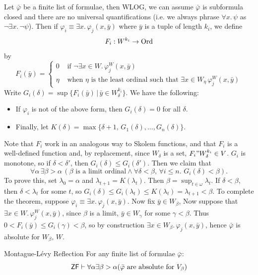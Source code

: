 \documentclass{article}
\begin{document}
\proof Let $\bar{\varphi}$ be a finite list of formulae, then WLOG, we can assume $\bar{\varphi}$ is subformula closed and there are no universal quantifications (i.e. we always phrase $\forall x.\, \psi$ as $\neg \exists x. \, \neg \psi$). \gap
Then if $\varphi_{i} \equiv \exists x.\, \varphi_{j} (x,\bar{y})$ where $\bar{y}$ is a tuple of length $k_{i}$, we define \[F_{i} : W^{k_{i}} \to \operatorname{Ord}\] by \[ F_{i}(\bar{y}) =
    \begin{cases}
        0    & \text{ if $\neg \exists x \in W. \, \varphi_{j}^{W}(x, \bar{y})$}                                        \\
        \eta & \text{ when $\eta$ is the least ordinal such that $\exists x \in W_{\eta}\, \varphi_{j}^{W}(x,\bar{y})$}
    \end{cases}\]
Write $G_{i}(\delta) = \sup \{ F_{i}(\bar{y}) \, | \, \bar{y} \in W_{\delta}^{k_{i}}\}$. We have the following: \begin{itemize}
    \item If $\varphi_{i}$ is not of the above form, then $G_{i}(\delta) = 0$ for all $\delta$.
    \item Finally, let $K(\delta) = \max\{\delta + 1,\, G_{1}(\delta), \dots, G_{n}(\delta)\}$.
\end{itemize}
Note that $F_{i}$ work in an analogous way to Skolem functions, and that $F_{i}$ is a well-defined function and, by replacement, since $W_{\delta}$ is a set, $F_{i}"W_{\delta}^{k_{i}} \in V$.
$G_{i}$ is monotone, so if $\delta < \delta'$, then $G_{i}(\delta) \leq G_{i}(\delta')$. Then we claim that \[ \forall \alpha \, \exists \beta > \alpha \, (\beta \text{ is a limit ordinal} \wedge \forall \delta < \beta, \, \forall i \leq n.\,\, G_{i}(\delta) < \beta).\]
To prove this, set $\lambda_{0} = \alpha$ and $\lambda_{t+1} = K(\lambda_{t})$. Then $\beta = \sup_{t \in \omega} \lambda_{t}$. If $\delta < \beta$, then $\delta < \lambda_{t}$ for some $t$, so $G_{i}(\delta) \leq G_{i}(\lambda_{t}) \leq K(\lambda_{t}) = \lambda_{t+1} < \beta$. \gap
To complete the theorem, suppose $\varphi_{i} \equiv \exists x.\, \varphi_{j}(x,\bar{y})$. Now fix $\bar{y} \in W_{\beta}$, Now suppose that $\exists x \in W. \, \varphi_{j}^{W}(x, \bar{y})$, since $\beta$ is a limit, $\bar{y} \in W_{\gamma}$ for some $\gamma < \beta$. Thus $0 < F_{i}(\bar{y}) \leq G_{i}(\gamma)< \beta$, so by construction $\exists x \in W_{\beta}.\, \varphi_{j}(x, \bar{y})$, hence $\bar{\varphi}$ is absolute for $W_{\beta},\,W$.
\endproof

\begin{corr}{Montague-L\'evy Reflection}
    For any finite list of formulae $\bar{\varphi}$: \[ \mathsf{ZF} \vdash \forall \alpha \exists \beta > \alpha (\bar{\varphi}\text{ are absolute for }V_{\beta})\]
\end{corr}
\end{document}

